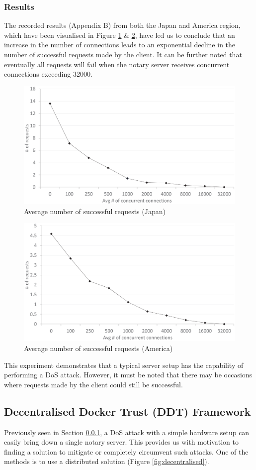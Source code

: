 \documentclass[a4paper,12pt]{article}
\begin{document}
{\subsubsection{Results}
\label{dosresult}
The recorded results (Appendix B) from both the Japan and America region, which have been visualised in Figure \ref{fig:t2smalljapavg} \& \ref{fig:t2smallamavg}, have led us to conclude that an increase in the number of connections leads to an exponential decline in the number of successful requests made by the client. It can be further noted that eventually all requests will fail when the notary server receives concurrent connections exceeding 32000.
\begin{figure}[H]
	\centering
	\includegraphics[width=0.7\linewidth]{t2smalljapavg.eps}
	\caption{Average number of successful requests (Japan)}
	\label{fig:t2smalljapavg}
\end{figure}
\begin{figure}[H]
	\centering
	\includegraphics[width=0.7\linewidth]{t2smallamavg.eps}
	\caption{Average number of successful requests (America)}
	\label{fig:t2smallamavg}
\end{figure}
\noindent
This experiment demonstrates that a typical server setup has the capability of performing a \ac{DoS} attack. However, it must be noted that there may be occasions where requests made by the client could still be successful.

	\subsection{Decentralised Docker Trust (DDT) Framework}
	Previously seen in Section \ref{dosresult}, a \ac{DoS} attack with a simple hardware setup can easily bring down a single notary server. This provides us with motivation to finding a solution to mitigate or completely circumvent such attacks. One of the methods is to use a distributed solution (Figure \ref{fig:decentralised}).
	
}
\end{document}
